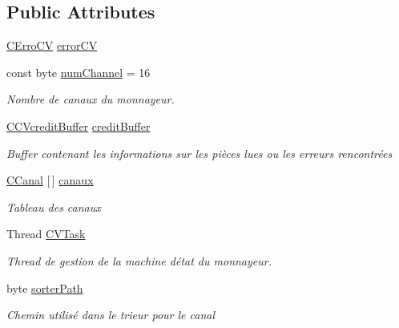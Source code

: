 \subsection*{Public Attributes}
\begin{DoxyCompactItemize}
\item 
\mbox{\hyperlink{class_device_library_1_1_c_coin_validator_1_1_c_erro_c_v}{C\+Erro\+CV}} \mbox{\hyperlink{class_device_library_1_1_c_coin_validator_a03b7719015059d51c015f7a95f3b9cca}{error\+CV}}
\item 
const byte \mbox{\hyperlink{class_device_library_1_1_c_coin_validator_a68f118167bcdf23f194ef02b779d4333}{num\+Channel}} = 16
\begin{DoxyCompactList}\small\item\em Nombre de canaux du monnayeur. \end{DoxyCompactList}\item 
\mbox{\hyperlink{class_device_library_1_1_c_coin_validator_1_1_c_c_vcredit_buffer}{C\+C\+Vcredit\+Buffer}} \mbox{\hyperlink{class_device_library_1_1_c_coin_validator_a0fce3a5cb9d620de02a2d6bfd89d72b1}{credit\+Buffer}}
\begin{DoxyCompactList}\small\item\em Buffer contenant les informations sur les pièces lues ou les erreurs rencontrées \end{DoxyCompactList}\item 
\mbox{\hyperlink{class_device_library_1_1_c_canal}{C\+Canal}} \mbox{[}$\,$\mbox{]} \mbox{\hyperlink{class_device_library_1_1_c_coin_validator_afdeb88b9e7e981afd51bd1322e9f89e9}{canaux}}
\begin{DoxyCompactList}\small\item\em Tableau des canaux \end{DoxyCompactList}\item 
Thread \mbox{\hyperlink{class_device_library_1_1_c_coin_validator_ada11d6936d839ad456e2bd9e66f3eb31}{C\+V\+Task}}
\begin{DoxyCompactList}\small\item\em Thread de gestion de la machine d\textquotesingle{}état du monnayeur. \end{DoxyCompactList}\item 
byte \mbox{\hyperlink{class_device_library_1_1_c_coin_validator_ab293634863b100aad9f167f189b49f19}{sorter\+Path}}
\begin{DoxyCompactList}\small\item\em Chemin utilisé dans le trieur pour le canal \end{DoxyCompactList}\end{DoxyCompactItemize}
